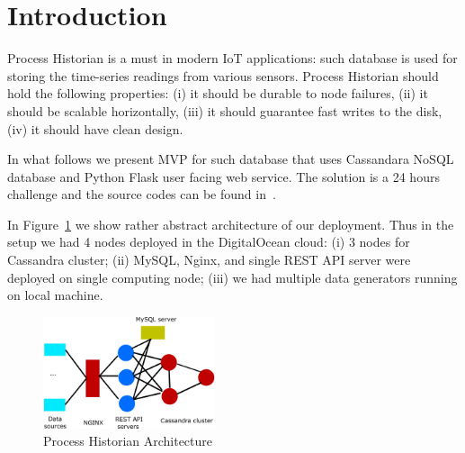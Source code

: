 \section{Introduction}
\label{section:introduction}

Process Historian is a must in modern IoT applications:
such database is used for storing the time-series readings
from various sensors. Process Historian should hold
the following properties: (i) it should be durable to node failures,
(ii) it should be scalable horizontally, (iii) it should guarantee 
fast writes to the disk, (iv) it should have clean design.

In what follows we present MVP for such database that uses 
Cassandara NoSQL database and Python Flask user facing 
web service. The solution is a 24 hours challenge 
and the source codes can be found in~\cite{git}.


In Figure~\ref{fig:arch} we show rather abstract architecture of our deployment.
Thus in the setup we had 4 nodes deployed in the DigitalOcean
cloud: (i) 3 nodes for Cassandra cluster; (ii) MySQL, Nginx,
and single REST API server were deployed on single computing node;
(iii) we had multiple data generators running on local machine.

\begin{figure}[!hbt]\centering
  \includegraphics[width=0.45\textwidth]{graphics/arch.png}
  \caption{Process Historian Architecture}
  \label{fig:arch}
\end{figure}

